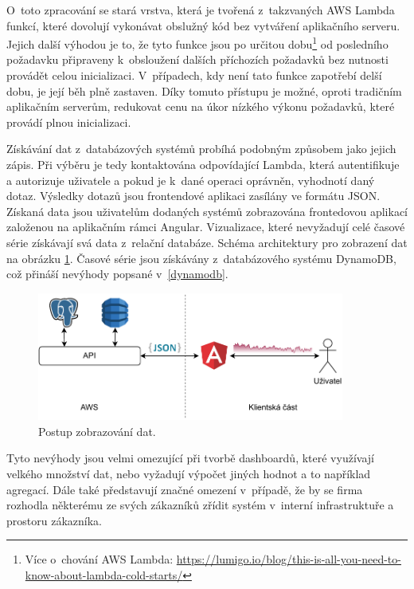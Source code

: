 O~toto zpracování se stará vrstva, která je tvořená z~takzvaných AWS Lambda funkcí, které dovolují vykonávat obslužný kód bez vytváření aplikačního serveru. Jejich další výhodou je to, že tyto funkce jsou po určitou dobu\footnote{Více o~chování AWS Lambda: \url{https://lumigo.io/blog/this-is-all-you-need-to-know-about-lambda-cold-starts/}} od posledního požadavku připraveny k~obsloužení dalších příchozích požadavků bez nutnosti provádět celou inicializaci. V~případech, kdy není tato funkce zapotřebí delší dobu, je její běh plně zastaven. Díky tomuto přístupu je možné, oproti tradičním aplikačním serverům, redukovat cenu na úkor nízkého výkonu požadavků, které provádí plnou inicializaci.
 
Získávání dat z~databázových systémů probíhá podobným způsobem jako jejich zápis. Při výběru je tedy kontaktována odpovídající Lambda, která autentifikuje a autorizuje uživatele a pokud je k~dané operaci oprávněn, vyhodnotí daný dotaz. Výsledky dotazů jsou frontendové aplikaci zasílány ve formátu JSON. Získaná data jsou uživatelům dodaných systémů zobrazována frontedovou aplikací založenou na aplikačním rámci Angular. Vizualizace, které nevyžadují celé časové série získávají svá data z~relační databáze. Schéma architektury pro zobrazení dat na obrázku \ref{DP-architecture-frontend}. Časové série jsou získávány z~databázového systému DynamoDB, což přináší nevýhody popsané v~\ref{dynamodb}.

\begin{figure}[H]
\label{DP-architecture-frontend}
\begin{center}
    \includegraphics[width=0.9\textwidth]{obrazky-figures/DP-architecture-frontend.drawio.pdf}
\end{center}
\caption{Postup zobrazování dat.}
\end{figure}

Tyto nevýhody jsou velmi omezující při tvorbě dashboardů, které využívají velkého množství dat, nebo vyžadují výpočet jiných hodnot a to například agregací. Dále také představují značné omezení v~případě, že by se firma rozhodla některému ze svých zákazníků zřídit systém v~interní infrastruktuře a prostoru zákazníka.

